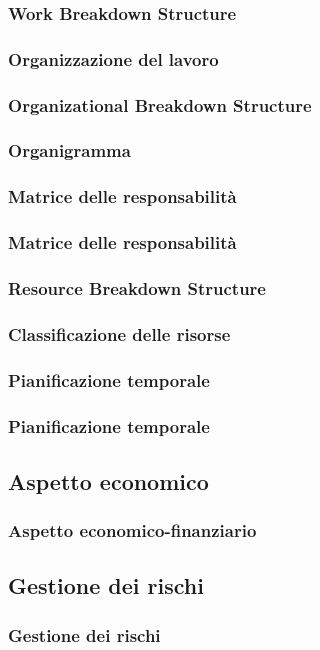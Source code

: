\documentclass[compress,9pt]{beamer}
\begin{document}
\subsubsection{Work Breakdown Structure}
\begin{frame}%
\frametitle{Organizzazione del lavoro}
\end{frame}

\subsubsection{Organizational Breakdown Structure}
\begin{frame}%
\frametitle{Organigramma}
\end{frame}

\subsubsection{Matrice delle responsabilità}
\begin{frame}%
\frametitle{Matrice delle responsabilità}
\end{frame}

\subsubsection{Resource Breakdown Structure}
\begin{frame} %
\frametitle{Classificazione delle risorse}
\end{frame}

\subsubsection{Pianificazione temporale}
\begin{frame}%
\frametitle{Pianificazione temporale}
\end{frame}

\subsection{Aspetto economico}
\begin{frame}%
\frametitle{Aspetto economico-finanziario}
\end{frame}

\subsection{Gestione dei rischi}
\begin{frame}%
\frametitle{Gestione dei rischi}
\end{frame}
\end{document}
